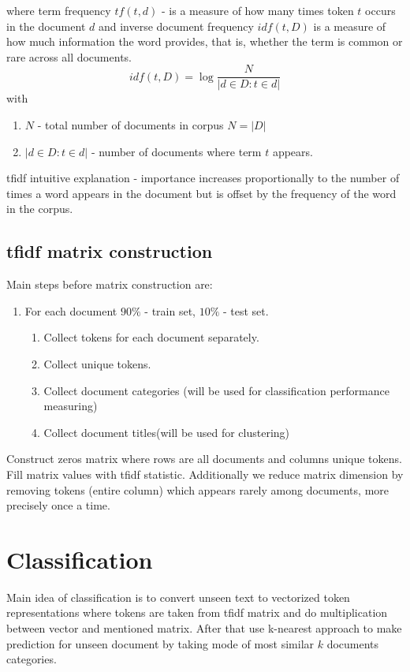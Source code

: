 \documentclass{article}
\begin{document}
where term frequency $ tf(t, d)$ - is a measure of how many times token $t$ occurs in the document $d$ and inverse document frequency $idf(t, D) $ is a measure of how much information the word provides, that is, whether the term is common or rare across all documents.
\begin{equation}
idf(t, D) = \log \frac{N}{|d\in D : t \in d|}
\label{idf}
\end{equation}
with 
\begin{enumerate}
\item $N$ - total number of documents in corpus $N = |D|$
\item $|d\in D : t \in d|$ - number of documents where term $t$ appears.
\end{enumerate}
tfidf intuitive explanation -  importance increases proportionally to the number of times a word appears in the document but is offset by the frequency of the word in the corpus.

\subsection{tfidf matrix construction}
Main steps before matrix construction are:
\begin{enumerate}
\item For each document $90\%$ - train set, $10\%$ - test set.
\begin{enumerate}
\item Collect tokens for each document separately.
\item Collect unique tokens.
\item Collect document categories (will be used for classification performance measuring)
\item Collect document titles(will be used for clustering)
\end{enumerate}
\end{enumerate}

Construct zeros matrix where rows are all documents and columns unique tokens. Fill matrix values with tfidf statistic. Additionally we reduce matrix dimension by removing tokens (entire column) which appears rarely among documents, more precisely  once a time.
\section{Classification}
Main idea of classification is to convert unseen text to vectorized token representations where tokens are taken from tfidf matrix and do multiplication between vector and mentioned matrix. After that use k-nearest approach to make prediction for unseen document by taking mode of most similar $k$ documents categories.
\end{document}
